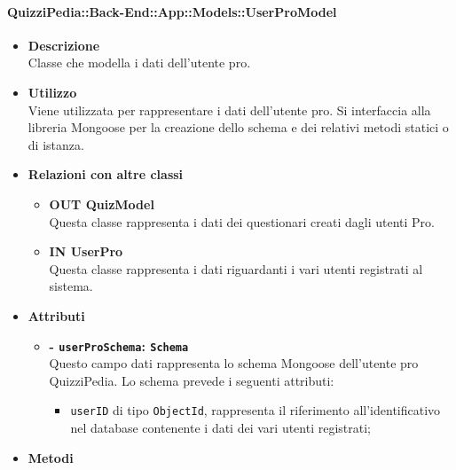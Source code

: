 \paragraph{QuizziPedia::Back-End::App::Models::UserProModel}
\label{QuizziPedia::Back-End::App::Models::UserProModel}
\begin{figure}
	
\end{figure}
\begin{itemize}
	\item \textbf{Descrizione} \\
	Classe che modella i dati dell'utente pro.
	\item \textbf{Utilizzo} \\
	Viene utilizzata per rappresentare i dati dell'utente pro. Si interfaccia alla libreria Mongoose per la creazione dello schema e dei relativi metodi statici o di istanza.
	\item \textbf{Relazioni con altre classi} 
		\begin{itemize}
			\item \textbf{OUT QuizModel} \\
			Questa classe rappresenta i dati dei questionari creati dagli utenti Pro.
			\item \textbf{IN UserPro} \\
			Questa classe rappresenta i dati riguardanti i vari utenti registrati al sistema.
		\end{itemize}
	\item \textbf{Attributi} 
		\begin{itemize}
			\item \textbf{- \texttt{userProSchema}: \texttt{Schema}} \\
			Questo campo dati rappresenta lo schema Mongoose dell'utente pro QuizziPedia. Lo schema prevede i seguenti attributi:
			\begin{itemize}
				\item 
					\texttt{userID} di tipo \texttt{ObjectId}, rappresenta il riferimento all'identificativo nel database contenente i dati dei vari utenti registrati;
			\end{itemize}		
		\end{itemize}	
	\item \textbf{Metodi}
		
\end{itemize}